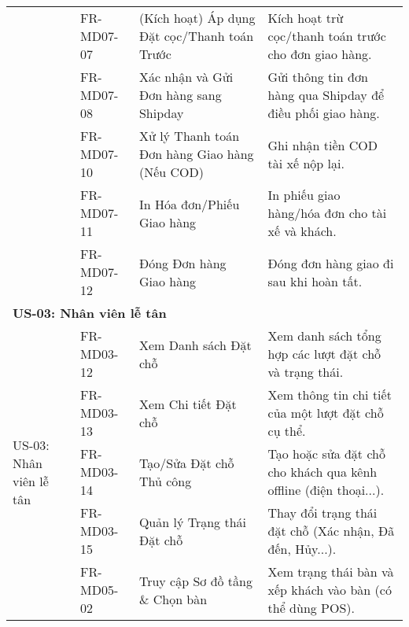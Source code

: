 \begin{longtable}{|m{2.5cm}|m{2.5cm}|m{5cm}|m{5cm}|}
	                                                        & FR-MD07-07            & (Kích hoạt) Áp dụng Đặt cọc/Thanh toán Trước           & Kích hoạt trừ cọc/thanh toán trước cho đơn giao hàng.                                       \\
	                                                        & FR-MD07-08            & Xác nhận và Gửi Đơn hàng sang Shipday                  & Gửi thông tin đơn hàng qua Shipday để điều phối giao hàng.                                  \\
	                                                        & FR-MD07-10            & Xử lý Thanh toán Đơn hàng Giao hàng (Nếu COD)          & Ghi nhận tiền COD tài xế nộp lại.                                                           \\
	                                                        & FR-MD07-11            & In Hóa đơn/Phiếu Giao hàng                             & In phiếu giao hàng/hóa đơn cho tài xế và khách.                                             \\
	                                                        & FR-MD07-12            & Đóng Đơn hàng Giao hàng                                & Đóng đơn hàng giao đi sau khi hoàn tất.                                                     \\
	\hline

	\multicolumn{4}{|l|}{\textbf{US-03: Nhân viên lễ tân}}                                                                                                                                                                                 \\ \hline
	\multirow{5}{=}[2pt]{US-03: Nhân viên lễ tân}           & FR-MD03-12            & Xem Danh sách Đặt chỗ                                  & Xem danh sách tổng hợp các lượt đặt chỗ và trạng thái.                                      \\
	                                                        & FR-MD03-13            & Xem Chi tiết Đặt chỗ                                   & Xem thông tin chi tiết của một lượt đặt chỗ cụ thể.                                         \\
	                                                        & FR-MD03-14            & Tạo/Sửa Đặt chỗ Thủ công                               & Tạo hoặc sửa đặt chỗ cho khách qua kênh offline (điện thoại...).                            \\
	                                                        & FR-MD03-15            & Quản lý Trạng thái Đặt chỗ                             & Thay đổi trạng thái đặt chỗ (Xác nhận, Đã đến, Hủy...).                                     \\ \cline{2-4}
	                                                        & FR-MD05-02            & Truy cập Sơ đồ tầng \& Chọn bàn                        & Xem trạng thái bàn và xếp khách vào bàn (có thể dùng POS).                                  \\
	\hline


\end{longtable}

